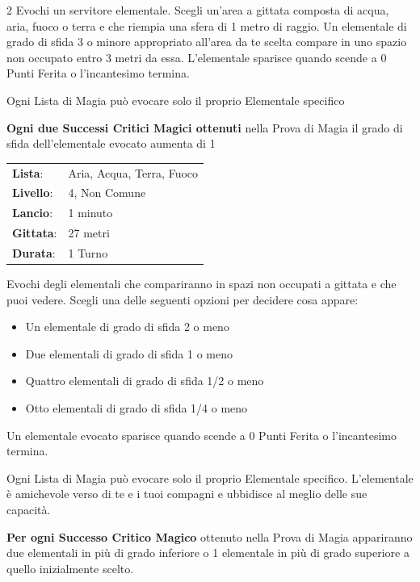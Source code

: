 \begin{multicols}{2}
Evochi un servitore elementale. Scegli un'area a gittata composta di acqua, aria, fuoco o terra e che riempia una sfera di 1 metro di raggio. Un elementale di grado di sfida 3 o minore appropriato all'area da te scelta compare in uno spazio non occupato entro 3 metri da essa. L'elementale sparisce quando scende a 0 Punti Ferita o l'incantesimo termina.

Ogni Lista di Magia può evocare solo il proprio Elementale specifico

\textbf{Ogni due Successi Critici Magici ottenuti} nella Prova di Magia il grado di sfida dell'elementale evocato aumenta di 1

\noindent\begin{tabularx}{\linewidth}{p{1.9cm}X}
	\rowcolor{gray!20}\textbf{Lista}: & Aria, Acqua, Terra, Fuoco \\
	\textbf{Livello}: & 4, Non Comune \\
	\rowcolor{gray!20}\textbf{Lancio}: & 1 minuto \\
	\textbf{Gittata}: & 27 metri \\
	\rowcolor{gray!20}\textbf{Durata}: & 1 Turno \\
\end{tabularx}\smallskip

Evochi degli elementali che compariranno in spazi non occupati a gittata e che puoi vedere. Scegli una delle seguenti opzioni per decidere cosa appare:

\begin{itemize}[leftmargin=*] \setlength{\itemsep}{-1pt}
	\item Un elementale di grado di sfida 2 o meno
	\item Due elementali di grado di sfida 1 o meno
	\item Quattro elementali di grado di sfida 1/2 o meno
	\item Otto elementali di grado di sfida 1/4 o meno
\end{itemize}

Un elementale evocato sparisce quando scende a 0 Punti Ferita o l'incantesimo termina.

Ogni Lista di Magia può evocare solo il proprio Elementale specifico. L'elementale è amichevole verso di te e i tuoi compagni e ubbidisce al meglio delle sue capacità.

\textbf{Per ogni Successo Critico Magico} ottenuto nella Prova di Magia appariranno due elementali in più di grado inferiore o 1 elementale in più di grado superiore a quello inizialmente scelto.


\end{multicols}

